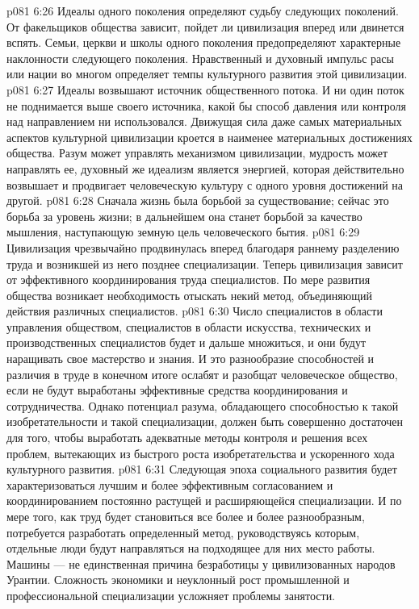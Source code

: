\vs p081 6:26 \bibnobreakspace {} Идеалы одного поколения определяют судьбу следующих поколений. От  факельщиков общества зависит, пойдет ли цивилизация вперед или двинется вспять. Семьи, церкви и школы одного поколения предопределяют характерные наклонности следующего поколения. Нравственный и духовный импульс расы или нации во многом определяет темпы культурного развития этой цивилизации.
\vs p081 6:27 Идеалы возвышают источник общественного потока. И ни один поток не поднимается выше своего источника, какой бы способ давления или контроля над направлением ни использовался. Движущая сила даже самых материальных аспектов культурной цивилизации кроется в наименее материальных достижениях общества. Разум может управлять механизмом цивилизации, мудрость может направлять ее, духовный же идеализм является энергией, которая действительно возвышает и продвигает человеческую культуру с одного уровня достижений на другой.
\vs p081 6:28 Сначала жизнь была борьбой за существование; сейчас это борьба за уровень жизни; в дальнейшем она станет борьбой за качество мышления, наступающую земную цель человеческого бытия.
\vs p081 6:29 \bibnobreakspace {} Цивилизация чрезвычайно продвинулась вперед благодаря раннему разделению труда и возникшей из него позднее специализации. Теперь цивилизация зависит от эффективного координирования труда специалистов. По мере развития общества возникает необходимость отыскать некий метод, объединяющий действия различных специалистов.
\vs p081 6:30 Число специалистов в области управления обществом, специалистов в области искусства, технических и производственных специалистов будет и дальше множиться, и они будут наращивать свое мастерство и знания. И это разнообразие способностей и различия в труде в конечном итоге ослабят и разобщат человеческое общество, если не будут выработаны эффективные средства координирования и сотрудничества. Однако потенциал разума, обладающего способностью к такой изобретательности и такой специализации, должен быть совершенно достаточен для того, чтобы выработать адекватные методы контроля и решения всех проблем, вытекающих из быстрого роста изобретательства и ускоренного хода культурного развития.
\vs p081 6:31 \bibnobreakspace {} Следующая эпоха социального развития будет характеризоваться лучшим и более эффективным согласованием и координированием постоянно растущей и расширяющейся специализации. И по мере того, как труд будет становиться все более и более разнообразным, потребуется разработать определенный метод, руководствуясь которым, отдельные люди будут направляться на подходящее для них место работы. Машины --- не единственная причина безработицы у цивилизованных народов Урантии. Сложность экономики и неуклонный рост промышленной и профессиональной специализации усложняет проблемы занятости.
